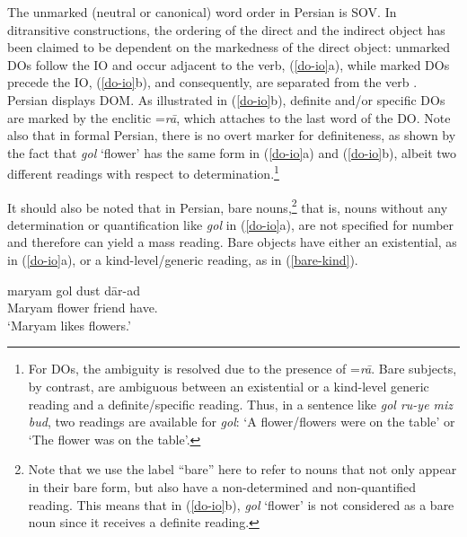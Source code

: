 \documentclass[output=paper]{langsci/langscibook}
\begin{document}
The unmarked (neutral or canonical) word order in Persian is SOV. In ditransitive constructions, the ordering of the direct and the indirect object has been claimed to be dependent on the markedness of the direct object: unmarked DOs follow the IO and occur adjacent to the verb, (\ref{do-io}a), while marked DOs precede the IO, (\ref{do-io}b), and consequently, are separated from the verb \citep[][among many others]{Browning&Karimi,mahootian97,Karimi2003}. 
Persian displays DOM. As illustrated in (\ref{do-io}b), definite and/or specific DOs are marked by the enclitic =\textit{r\=a}, which attaches to the last word of the DO. Note also that in formal Persian, there is no overt marker for definiteness, as shown by the fact that \textit{gol} `flower' has the same form in (\ref{do-io}a) and (\ref{do-io}b), albeit two different readings with respect to determination.\footnote{For DOs, the ambiguity is resolved due to the presence of =\textit{r\=a}. Bare subjects, by contrast, are ambiguous between an existential or a kind-level generic reading and a definite/specific reading. Thus, in a sentence like \textit{gol ru-ye miz bud}, two readings are available for \textit{gol}: `A flower/flowers were on the table' or `The flower was on the table'.}

It should also be noted that in Persian, bare nouns,\footnote{Note that we use the label ``bare'' here to refer to nouns that not only appear in their bare form, but also have a non-determined and non-quantified reading. This means that in (\ref{do-io}b), \textit{gol} `flower' is not considered as a bare noun since it receives a definite reading.} that is, nouns without any determination or quantification like \textit{gol} in (\ref{do-io}a), are not specified for number and therefore can yield a mass reading. Bare objects have either an existential, as in (\ref{do-io}a), or a kind-level/generic reading, as in (\ref{bare-kind}).

\begin{exe}
	\ex\label{do-io}
	\begin{xlist}
		
		
		
	\end{xlist}
	
	\ex\label{bare-kind}
	\gll maryam gol dust d\=ar-ad\\
	Maryam flower friend have.\\
	\glt `Maryam likes flowers.'
\end{exe}
\end{document}
